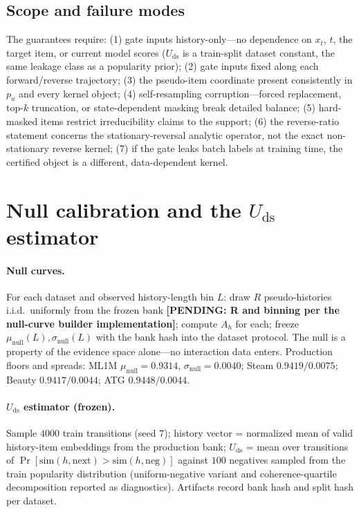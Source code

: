 \documentclass[letterpaper]{article}
\newcommand{\pending}[1]{{\color{red}\textbf{[PENDING: #1]}}}
\newcommand{\pu}{p_{u}}
\newcommand{\Uds}{U_{\mathrm{ds}}}
\begin{document}
\subsection{Scope and failure modes}
\label{app:boundary}
The guarantees require: (1) gate inputs history-only---no dependence on
$x_t$, $t$, the target item, or current model scores ($\Uds$ is a
train-split dataset constant, the same leakage class as a popularity
prior); (2) gate inputs fixed along each forward/reverse trajectory;
(3) the pseudo-item coordinate present consistently in $\pu$ and every
kernel object; (4) self-resampling corruption---forced replacement,
top-$k$ truncation, or state-dependent masking break detailed balance;
(5) hard-masked items restrict irreducibility claims to the support;
(6) the reverse-ratio statement concerns the stationary-reversal
analytic operator, not the exact non-stationary reverse kernel; (7) if
the gate leaks batch labels at training time, the certified object is a
different, data-dependent kernel.

\section{Null calibration and the $\Uds$ estimator}
\label{app:uds}

\paragraph{Null curves.}
For each dataset and observed history-length bin $L$: draw $R$
pseudo-histories i.i.d.\ uniformly from the frozen bank
\pending{R and binning per the null-curve builder implementation};
compute $A_h$ for each; freeze
$\mu_{\mathrm{null}}(L),\sigma_{\mathrm{null}}(L)$ with the bank hash
into the dataset protocol. The null is a property of the evidence space
alone---no interaction data enters. Production floors and spreads:
ML1M $\mu_{\mathrm{null}}{=}0.9314$, $\sigma_{\mathrm{null}}{=}0.0040$;
Steam $0.9419/0.0075$; Beauty $0.9417/0.0044$; ATG $0.9448/0.0044$.

\paragraph{$\Uds$ estimator (frozen).}
Sample $4000$ train transitions (seed $7$); history vector = normalized
mean of valid history-item embeddings from the production bank; $\Uds$
= mean over transitions of
$\Pr[\mathrm{sim}(h,\text{next})>\mathrm{sim}(h,\text{neg})]$ against
$100$ negatives sampled from the train popularity distribution
(uniform-negative variant and coherence-quartile decomposition reported
as diagnostics). Artifacts record bank hash and split hash per dataset.
\end{document}
